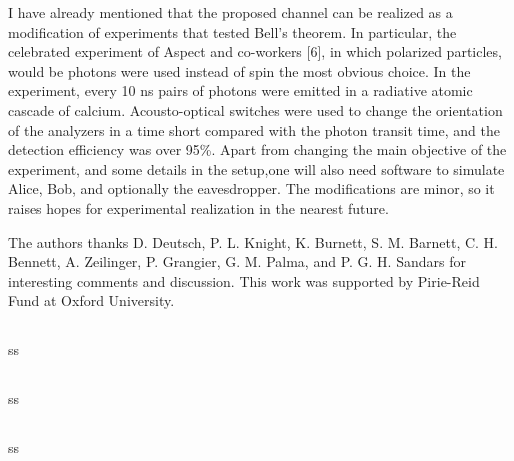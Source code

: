 I have already mentioned that the proposed channel can be realized as a modification of experiments that tested Bell's theorem. In particular, the celebrated experiment of Aspect and co-workers [6], in which polarized particles, would be photons were used instead of spin the most obvious choice. In the experiment, every 10 ns pairs of photons were emitted in a radiative atomic cascade of calcium. Acousto-optical switches were used to change the orientation of the analyzers in a time short compared with the photon transit time, and the detection efficiency was over 95\%. Apart from changing the main objective of the experiment, and some details in the setup,one will also need software to simulate Alice, Bob, and optionally the eavesdropper. The modifications are minor, so it raises hopes for experimental realization in the nearest future.

The authors thanks D. Deutsch, P. L. Knight, K. Burnett, S. M. Barnett, C. H. Bennett, A. Zeilinger, P. Grangier, G. M. Palma, and P. G. H. Sandars for interesting comments and discussion. This work was supported by Pirie-Reid Fund at Oxford University.

\subsection{\trnas}
ss
\subsection{\review}
ss
\subsection{\dic}
ss
